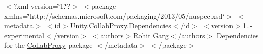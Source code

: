 $<$?xml version=\char`\"{}1.\char`\"{}?$>$ $<$package xmlns=\char`\"{}http\+://schemas.\+microsoft.\+com/packaging/2013/05/nuspec.\+xsd\char`\"{}$>$ $<$metadata$>$ $<$id$>$Unity.\+Collab\+Proxy.\+Dependencies$<$/id$>$ $<$version$>$1..-\/experimental$<$/version$>$ $<$authors$>$Rohit Garg$<$/authors$>$ Dependencies for the \mbox{\hyperlink{namespace_collab_proxy}{Collab\+Proxy}} package $<$/metadata$>$ $<$/package$>$ 
